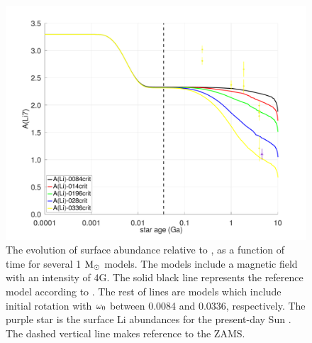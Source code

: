 \documentclass[fleqn,usenatbib]{mnras}
\begin{document}
\begin{figure}
	\includegraphics[clip, width=\columnwidth]{figures/paper2/li_var_vel_4_0g4.pdf}
    \caption{The evolution of surface  abundance relative to , as a function of time for several 1 $\mathrm{M}_\odot$ models. The models include a magnetic field with an intensity of 4G. The solid black line represents the reference model according to \citet{Choi2016}. The rest of lines are models which include initial rotation with $\omega_{\mathrm{0}}$ between 0.0084 and 0.0336, respectively. The purple star is the surface Li abundances for the present-day Sun \citep{Asplund2009}. The dashed vertical line makes reference to the ZAMS.}
    \label{fig:li_var_vel_4_0g4}
\end{figure}
\end{document}
